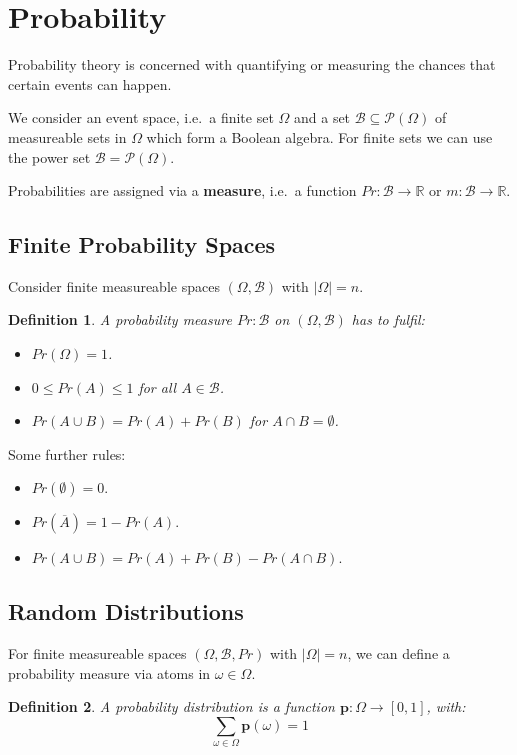\documentclass[11pt]{article}
\newtheorem{defn}{Definition}
\begin{document}
\section{Probability}
Probability theory is concerned with quantifying or measuring the chances that certain events can happen.

We consider an event space, i.e.\ a finite set $\Omega$ and a set $\mathcal{B} \subseteq \mathcal{P}(\Omega)$ of measureable sets in $\Omega$ which form a Boolean algebra.
For finite sets we can use the power set $\mathcal{B} = \mathcal{P}(\Omega)$.

Probabilities are assigned via a \textbf{measure}, i.e.\ a function $Pr : \mathcal{B} \rightarrow \mathbb{R}$ or $m : \mathcal{B} \rightarrow \mathbb{R}$.

\subsection{Finite Probability Spaces}
Consider finite measureable spaces $(\Omega, \mathcal{B})$ with $\lvert \Omega \rvert = n$.

\begin{defn}
  A probability measure $Pr : \mathcal{B}$ on $(\Omega, \mathcal{B})$ has to fulfil:
  \begin{itemize}
    \item $Pr(\Omega) = 1$.
    \item $0 \leq Pr(A) \leq 1$ for all $A \in \mathcal{B}$.
    \item $Pr(A \cup B) = Pr(A) + Pr(B)$ for $A \cap B = \emptyset$.
  \end{itemize}
\end{defn}

Some further rules:
\begin{itemize}
  \item $Pr(\emptyset) = 0$.
  \item $Pr(\overline{A}) = 1 - Pr(A)$.
  \item $Pr(A \cup B) = Pr(A) + Pr(B) - Pr(A \cap B)$.
\end{itemize}

\subsection{Random Distributions}
For finite measureable spaces $(\Omega, \mathcal{B}, Pr)$ with $\lvert \Omega \rvert = n$, we can define a probability measure via atoms in $\omega \in \Omega$.

\begin{defn}
  A probability distribution is a function $\textbf{p} : \Omega \rightarrow [0, 1]$, with:
  \[
    \sum_{\omega \in \Omega} \textbf{p}(\omega) = 1
  \]
\end{defn}
\end{document}
